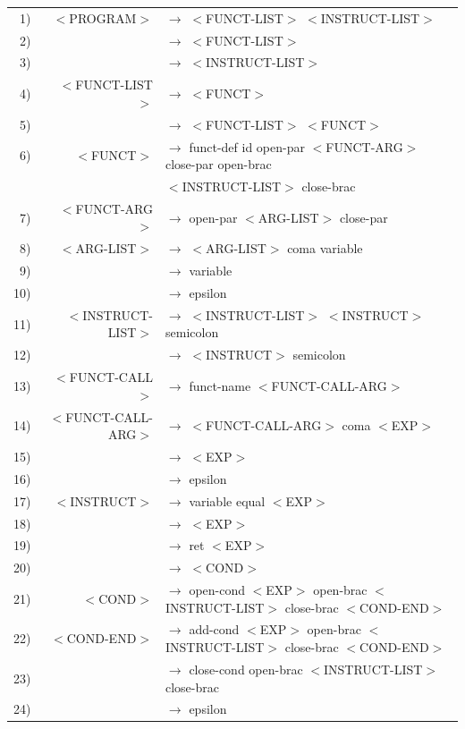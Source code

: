 \documentclass[a4paper,10pt]{article}
\begin{document}
\hspace{-1.0cm}\begin{tabular}{rrl}
1)&$<$PROGRAM$>$		& $\rightarrow$ $<$FUNCT-LIST$>$ $<$INSTRUCT-LIST$>$\\ 
2)&					& $\rightarrow$ $<$FUNCT-LIST$>$\\  
3)&					& $\rightarrow$ $<$INSTRUCT-LIST$>$\\  					
4)&$<$FUNCT-LIST$>$	& $\rightarrow$ $<$FUNCT$>$ \\ 
5)&					& $\rightarrow$ $<$FUNCT-LIST$>$ $<$FUNCT$>$\\ 				
6)&$<$FUNCT$>$			& $\rightarrow$ funct-def id open-par $<$FUNCT-ARG$>$ close-par open-brac \\
&						& $<$INSTRUCT-LIST$>$ close-brac \\  			
7)&$<$FUNCT-ARG$>$		& $\rightarrow$ open-par $<$ARG-LIST$>$ close-par\\  
8)&$<$ARG-LIST$>$		& $\rightarrow$ $<$ARG-LIST$>$ coma variable \\   
9)&					& $\rightarrow$ variable\\   
10)&					& $\rightarrow$ epsilon \\  

11)&$<$INSTRUCT-LIST$>$	& $\rightarrow$ $<$INSTRUCT-LIST$>$ $<$INSTRUCT$>$ semicolon\\ 
12)&					& $\rightarrow$ $<$INSTRUCT$>$ semicolon\\ 
					
13)&$<$FUNCT-CALL$>$	& $\rightarrow$ funct-name $<$FUNCT-CALL-ARG$>$\\ 

14)&$<$FUNCT-CALL-ARG$>$& $\rightarrow$ $<$FUNCT-CALL-ARG$>$ coma $<$EXP$>$\\ 
15)&					& $\rightarrow$ $<$EXP$>$\\ 
16)&					& $\rightarrow$ epsilon\\ 

17)&$<$INSTRUCT$>$		& $\rightarrow$ variable equal $<$EXP$>$\\ 
18)&					& $\rightarrow$ $<$EXP$>$\\
19)&					& $\rightarrow$ ret $<$EXP$>$\\
20)&					& $\rightarrow$ $<$COND$>$\\
					
21)&$<$COND$>$			& $\rightarrow$ open-cond $<$EXP$>$ open-brac $<$INSTRUCT-LIST$>$ close-brac $<$COND-END$>$\\



22)&$<$COND-END$>$		& $\rightarrow$ add-cond $<$EXP$>$ open-brac $<$INSTRUCT-LIST$>$ close-brac $<$COND-END$>$ \\
23)&					& $\rightarrow$ close-cond open-brac $<$INSTRUCT-LIST$>$ close-brac\\
24)&					& $\rightarrow$ epsilon \\
					

\end{tabular}
\end{document}
